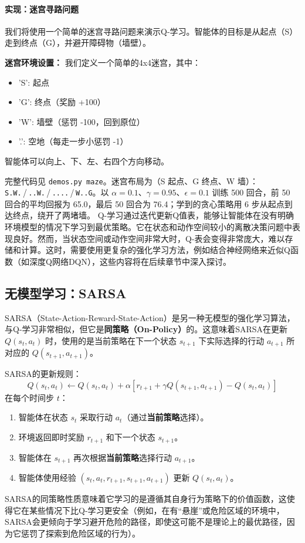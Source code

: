 \paragraph{实现：迷宫寻路问题}
我们将使用一个简单的迷宫寻路问题来演示Q-学习。智能体的目标是从起点（S）走到终点（G），并避开障碍物（墙壁）。

\textbf{迷宫环境设置：}
我们定义一个简单的4x4迷宫，其中：
\begin{itemize}
    \item 'S': 起点
    \item 'G': 终点（奖励 +100）
    \item 'W': 墙壁（惩罚 -100，回到原位）
    \item '.': 空地（每走一步小惩罚 -1）
\end{itemize}
智能体可以向上、下、左、右四个方向移动。

完整代码见 \texttt{demos.py maze}。迷宫布局为（S 起点、G 终点、W 墙）：\texttt{S.W.}\,/\,\texttt{..W.}\,/\,\texttt{....}\,/\,\texttt{W..G}。以 $\alpha=0.1$、$\gamma=0.95$、$\epsilon=0.1$ 训练 500 回合，前 50 回合的平均回报为 65.0，最后 50 回合为 76.4；学到的贪心策略用 6 步从起点到达终点，绕开了两堵墙。
Q-学习通过迭代更新Q值表，能够让智能体在没有明确环境模型的情况下学习到最优策略。它在状态和动作空间较小的离散决策问题中表现良好。然而，当状态空间或动作空间非常大时，Q-表会变得非常庞大，难以存储和计算。这时，需要使用更复杂的强化学习方法，例如结合神经网络来近似Q函数（如深度Q网络DQN），这些内容将在后续章节中深入探讨。


\subsection{无模型学习：SARSA}
SARSA（State-Action-Reward-State-Action）是另一种无模型的强化学习算法，与Q-学习非常相似，但它是\textbf{同策略（On-Policy）}的。这意味着SARSA在更新 $Q(s_t, a_t)$ 时，使用的是当前策略在下一个状态 $s_{t+1}$ 下实际选择的行动 $a_{t+1}$ 所对应的 $Q(s_{t+1}, a_{t+1})$。

SARSA的更新规则：
$$ Q(s_t, a_t) \leftarrow Q(s_t, a_t) + \alpha [r_{t+1} + \gamma Q(s_{t+1}, a_{t+1}) - Q(s_t, a_t)] $$
在每个时间步 $t$：
\begin{enumerate}
    \item 智能体在状态 $s_t$ 采取行动 $a_t$（通过\textbf{当前策略}选择）。
    \item 环境返回即时奖励 $r_{t+1}$ 和下一个状态 $s_{t+1}$。
    \item 智能体在 $s_{t+1}$ 再次根据\textbf{当前策略}选择行动 $a_{t+1}$。
    \item 智能体使用经验 $(s_t, a_t, r_{t+1}, s_{t+1}, a_{t+1})$ 更新 $Q(s_t, a_t)$。
\end{enumerate}
SARSA的同策略性质意味着它学习的是遵循其自身行为策略下的价值函数，这使得它在某些情况下比Q-学习更安全（例如，在有“悬崖”或危险区域的环境中，SARSA会更倾向于学习避开危险的路径，即使这可能不是理论上的最优路径，因为它惩罚了探索到危险区域的行为）。

